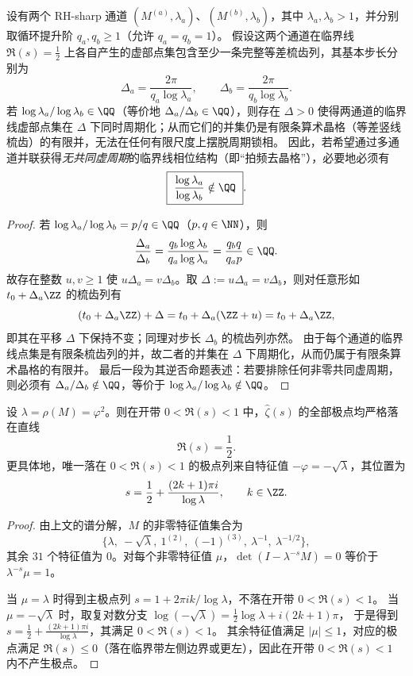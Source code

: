 \begin{proposition}\label{prop:finite-rh-beat-irrational-log}
设有两个 RH-sharp 通道 \((M^{(a)},\lambda_a)\)、\((M^{(b)},\lambda_b)\)，其中 \(\lambda_a,\lambda_b>1\)，并分别取循环提升阶 \(q_a,q_b\ge 1\)（允许 \(q_a=q_b=1\)）。
假设这两个通道在临界线 \(\Re(s)=\tfrac12\) 上各自产生的虚部点集包含至少一条完整等差梳齿列，其基本步长分别为
\[
\Delta_a=\frac{2\pi}{q_a\log\lambda_a},\qquad
\Delta_b=\frac{2\pi}{q_b\log\lambda_b}.
\]
若 \(\log\lambda_a/\log\lambda_b\in\QQ\)（等价地 \(\Delta_a/\Delta_b\in\QQ\)），则存在 \(\Delta>0\) 使得两通道的临界线虚部点集在 \(\Delta\) 下同时周期化；从而它们的并集仍是有限条算术晶格（等差竖线梳齿）的有限并，无法在任何有限尺度上摆脱周期锁相。
因此，若希望通过多通道并联获得\emph{无共同虚周期}的临界线相位结构（即“拍频去晶格”），必要地必须有
\[
\boxed{\ \frac{\log\lambda_a}{\log\lambda_b}\notin\QQ\ }.
\]
\end{proposition}
\begin{proof}
若 \(\log\lambda_a/\log\lambda_b=p/q\in\QQ\)（\(p,q\in\NN\)），则
\[
\frac{\Delta_a}{\Delta_b}
=\frac{q_b\log\lambda_b}{q_a\log\lambda_a}
=\frac{q_b q}{q_a p}\in\QQ.
\]
故存在整数 \(u,v\ge 1\) 使 \(u\Delta_a=v\Delta_b\)。取 \(\Delta:=u\Delta_a=v\Delta_b\)，则对任意形如 \(t_0+\Delta_a\ZZ\) 的梳齿列有
\[
(t_0+\Delta_a\ZZ)+\Delta=t_0+\Delta_a(\ZZ+u)=t_0+\Delta_a\ZZ,
\]
即其在平移 \(\Delta\) 下保持不变；同理对步长 \(\Delta_b\) 的梳齿列亦然。
由于每个通道的临界线点集是有限条梳齿列的并，故二者的并集在 \(\Delta\) 下周期化，从而仍属于有限条算术晶格的有限并。
最后一段为其逆否命题表述：若要排除任何非零共同虚周期，则必须有 \(\Delta_a/\Delta_b\notin\QQ\)，等价于 \(\log\lambda_a/\log\lambda_b\notin\QQ\)。
\end{proof}

\begin{proposition}[临界带中的非平凡极点都在 \texorpdfstring{$\Re(s)=\tfrac12$}{Re(s)=1/2}]\label{prop:finite-rh-40}
设 $\lambda=\rho(M)=\varphi^2$。则在开带 $0<\Re(s)<1$ 中，$\widehat{\zeta}(s)$ 的全部极点均严格落在直线
\[
\Re(s)=\frac12.
\]
更具体地，唯一落在 $0<\Re(s)<1$ 的极点列来自特征值 $-\varphi=-\sqrt{\lambda}$，其位置为
\[
s=\frac12+\frac{(2k+1)\pi i}{\log\lambda},\qquad k\in\ZZ.
\]
\end{proposition}

\begin{proof}
由上文的谱分解，$M$ 的非零特征值集合为
\[
\{\lambda,\ -\sqrt{\lambda},\ 1^{(2)},\ (-1)^{(3)},\ \lambda^{-1},\ \lambda^{-1/2}\},
\]
其余 $31$ 个特征值为 $0$。对每个非零特征值 $\mu$，$\det(I-\lambda^{-s}M)=0$ 等价于 $\lambda^{-s}\mu=1$。

当 $\mu=\lambda$ 时得到主极点列 $s=1+2\pi i k/\log\lambda$，不落在开带 $0<\Re(s)<1$。
当 $\mu=-\sqrt{\lambda}$ 时，取复对数分支 $\log(-\sqrt{\lambda})=\tfrac12\log\lambda+i(2k+1)\pi$，
于是得到
\(
s=\tfrac12+\frac{(2k+1)\pi i}{\log\lambda}
\)，其满足 $0<\Re(s)<1$。
其余特征值满足 $|\mu|\le 1$，对应的极点满足 $\Re(s)\le 0$（落在临界带左侧边界或更左），因此在开带 $0<\Re(s)<1$ 内不产生极点。
\end{proof}

